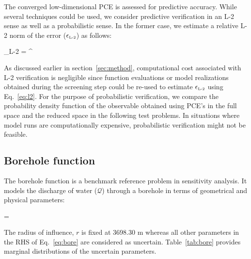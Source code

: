 The converged low-dimensional PCE is assessed
for predictive accuracy. While several techniques could be used, we consider predictive verification
in an L-2 sense as well as a probabilistic sense. In the former case, we estimate a relative L-2 norm
of the error ($\epsilon_{\mbox{\tiny{L-2}}}$) as follows:

\be
\epsilon_{\mbox{\tiny{L-2}}} = 
{\left[\sum_{i=1}^N
\left(\mathcal{Y}^{\mbox{\tiny M}}(\bm{\theta}_i)\right)^2\right]^{}}
\label{eq:l2}
\ee

\noindent As discussed earlier in section~\ref{sec:method}, computational cost associated with
L-2 verification is negligible since function evaluations or model realizations obtained during the
screening step could be re-used to estimate $\epsilon_{\mbox{\tiny{L-2}}}$ using Eq.~\ref{eq:l2}.
For the purpose of probabilistic verification, we compare the probability density function of
the observable obtained using PCE's in the full space and the reduced space in the following
test problems. In situations where model runs are computationally expensive, probabilistic verification might
not be feasible. 

\subsection{Borehole function}

The borehole function is a benchmark reference problem in sensitivity analysis. It models the discharge
of water ($\mathcal{Q}$) through a borehole in terms of geometrical and physical parameters:

\be
{} = 
\label{eq:bore}
\ee

\noindent The radius of influence, $r$ is fixed at 3698.30 m whereas all other parameters
in the RHS of Eq.~\ref{eq:bore} are considered as uncertain. Table~\ref{tab:bore} provides
marginal distributions of the uncertain parameters. 

